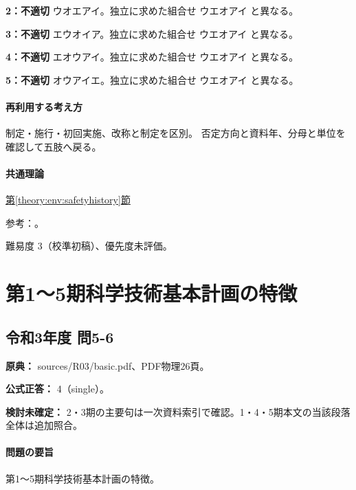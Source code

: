 \noindent\textbf{2：不適切} ウオエアイ。独立に求めた組合せ ウエオアイ と異なる。\par

\noindent\textbf{3：不適切} エウオイア。独立に求めた組合せ ウエオアイ と異なる。\par

\noindent\textbf{4：不適切} エオウアイ。独立に求めた組合せ ウエオアイ と異なる。\par

\noindent\textbf{5：不適切} オウアイエ。独立に求めた組合せ ウエオアイ と異なる。\par

\paragraph{再利用する考え方} 制定・施行・初回実施、改称と制定を区別。 否定方向と資料年、分母と単位を確認して五肢へ戻る。

\paragraph{共通理論} \hyperref[theory:env:safetyhistory]{第\ref*{theory:env:safetyhistory}節}

\par 参考：\cite{env60_safety}。

\par 難易度 3（校準初稿）、優先度未評価。

\section{第1〜5期科学技術基本計画の特徴}

\subsection{令和3年度 問5-6}
\label{q:r03-reg-basic-5-6}

\noindent\textbf{原典：} sources/R03/basic.pdf、PDF物理26頁。

\textbf{公式正答：} 4（single）。

\par\textbf{検討未確定：} 2・3期の主要句は一次資料索引で確認。1・4・5期本文の当該段落全体は追加照合。

\paragraph{問題の要旨} 第1〜5期科学技術基本計画の特徴。

